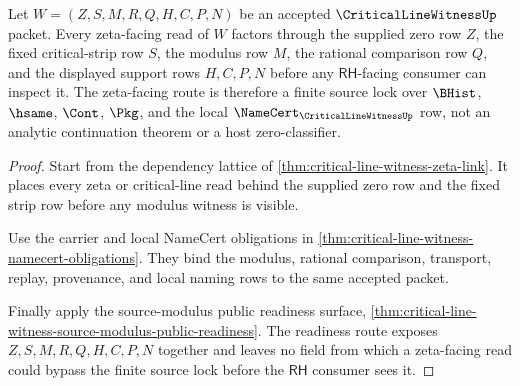 \begin{theorem}
\label{thm:critical-line-witness-zeta-source-lock}
Let $W=(Z,S,M,R,Q,H,C,P,N)$ be an accepted $\CriticalLineWitnessUp$ packet.
Every zeta-facing read of $W$ factors through the supplied zero row $Z$, the
fixed critical-strip row $S$, the modulus row $M$, the rational comparison
row $Q$, and the displayed support rows $H,C,P,N$ before any
$\mathsf{RH}$-facing consumer can inspect it. The zeta-facing route is
therefore a finite source lock over $\BHist$, $\hsame$, $\Cont$, $\Pkg$, and
the local $\NameCert_{\CriticalLineWitnessUp}$ row, not an analytic
continuation theorem or a host zero-classifier.
\end{theorem}
\begin{proof}
Start from the dependency lattice of
\autoref{thm:critical-line-witness-zeta-link}. It places every zeta or
critical-line read behind the supplied zero row and the fixed strip row before
any modulus witness is visible.

Use the carrier and local NameCert obligations in
\autoref{thm:critical-line-witness-namecert-obligations}. They bind the
modulus, rational comparison, transport, replay, provenance, and local naming
rows to the same accepted packet.

Finally apply the source-modulus public readiness surface,
\autoref{thm:critical-line-witness-source-modulus-public-readiness}. The
readiness route exposes $Z,S,M,R,Q,H,C,P,N$ together and leaves no field from
which a zeta-facing read could bypass the finite source lock before the
$\mathsf{RH}$ consumer sees it.
\end{proof}

